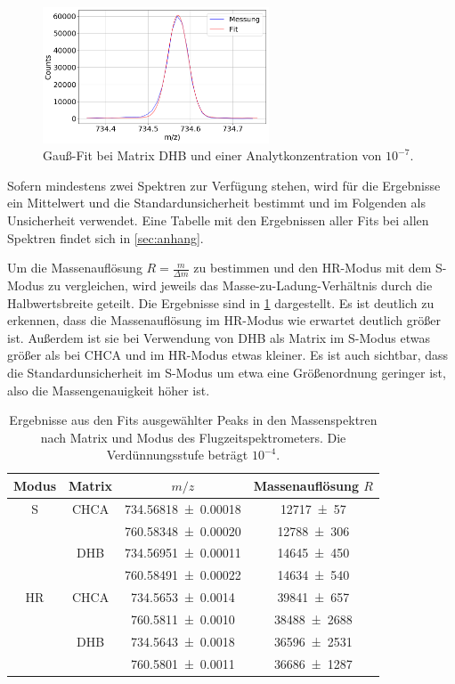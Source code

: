 \begin{figure}[!ht]
    \centering
    \includegraphics[width=0.6\textwidth]{img/a04_S_gaussfit}
    \caption{Gauß-Fit bei Matrix DHB und einer Analytkonzentration von $10^{-7}$.}
    \label{fig_gaussfit}
\end{figure}

Sofern mindestens zwei Spektren zur Verfügung stehen, wird für die Ergebnisse ein Mittelwert und die Standardunsicherheit bestimmt und im Folgenden als Unsicherheit verwendet.
Eine Tabelle mit den Ergebnissen aller Fits bei allen Spektren findet sich in \cref{sec:anhang}.

Um die Massenauflösung $R=\frac{m}{\Delta m}$ zu bestimmen und den HR-Modus mit dem S-Modus zu vergleichen, wird jeweils das Masse-zu-Ladung-Verhältnis durch die Halbwertsbreite geteilt.
Die Ergebnisse sind in \cref{tab:HR-S-vgl} dargestellt.
Es ist deutlich zu erkennen, dass die Massenauflösung im HR-Modus wie erwartet deutlich größer ist.
Außerdem ist sie bei Verwendung von  DHB als Matrix im S-Modus etwas größer als bei CHCA und im HR-Modus etwas kleiner.
Es ist auch sichtbar, dass die Standardunsicherheit im S-Modus um etwa eine Größenordnung geringer ist, also die Massengenauigkeit höher ist.

\begin{table}[H]
	\centering
	\caption{Ergebnisse aus den Fits ausgewählter Peaks in den Massenspektren nach Matrix und Modus des Flugzeitspektrometers. Die Verdünnungsstufe beträgt $10^{-4}$.}
	   \begin{tabular}{c | c | c | c }
      Modus & Matrix & $m/z$ & Massenauflösung $R$ \\ \hline
      S & CHCA & \SI{734,56818 \pm 0,00018}{} & \SI{12717 \pm 57}{} \\
        &      & \SI{760,58348 \pm 0,00020}{} & \SI{12788 \pm 306}{} \\
        & DHB  & \SI{734,56951 \pm 0,00011}{} & \SI{14645 \pm 450}{} \\
        &      & \SI{760,58491 \pm 0,00022}{} & \SI{14634 \pm 540}{} \\
      HR& CHCA & \SI{734,5653  \pm 0,0014}{}  & \SI{39841 \pm 657}{} \\
        &      & \SI{760,5811  \pm 0,0010}{}  & \SI{38488 \pm 2688}{} \\
        & DHB  & \SI{734,5643  \pm 0,0018}{}  & \SI{36596 \pm 2531}{} \\
        &      & \SI{760,5801  \pm 0,0011}{}  & \SI{36686 \pm 1287}{} \\
	\end{tabular}
	\label{tab:HR-S-vgl}
\end{table}

